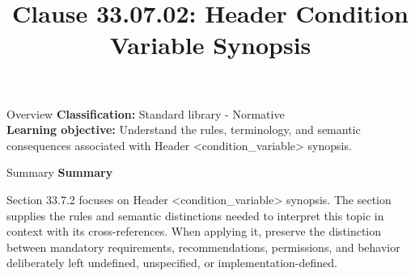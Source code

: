 \documentclass[10pt,letterpaper]{article}
\title{Clause 33.07.02: Header Condition Variable Synopsis}
\author{}
\date{}
\begin{document}
\maketitle
\begin{CornellOverviewBox}{Overview}
\textbf{Classification:} Standard library - Normative\\[2pt]
\textbf{Learning objective:} Understand the rules, terminology, and semantic consequences associated with Header <condition\_variable> synopsis.
\end{CornellOverviewBox}\begin{CornellSummaryBox}{Summary}
{\sffamily\bfseries\color{Accent} Summary}\par\vspace{3pt}Section 33.7.2 focuses on Header <condition\_variable> synopsis. The section supplies the rules and semantic distinctions needed to interpret this topic in context with its cross-references. When applying it, preserve the distinction between mandatory requirements, recommendations, permissions, and behavior deliberately left undefined, unspecified, or implementation-defined.
\end{CornellSummaryBox}
\end{document}
